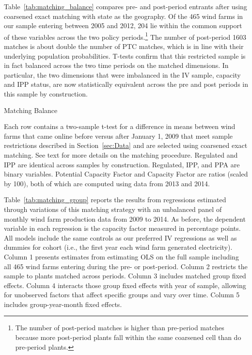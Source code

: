 \documentclass[12pt]{article}
\begin{document}
Table~\ref{tab:matching_balance} compares pre- and post-period entrants after using coarsened exact matching with state as the geography. Of the 465 wind farms in our sample entering between 2005 and 2012, 204 lie within the common support of these variables across the two policy periods.\footnote{The number of post-period matches is higher than pre-period matches because more post-period plants fall within the same coarsened cell than do pre-period plants.} The number of post-period 1603 matches is about double the number of PTC matches, which is in line with their underlying population probabilities. T-tests confirm that this restricted sample is in fact balanced across the two time periods on the matched dimensions. In particular, the two dimensions that were imbalanced in the IV sample, capacity and IPP status, are now statistically equivalent across the pre and post periods in this sample by construction. 

\begin{table}[h]
\caption{Matching Balance \label{tab:matching_balance}}

\footnotesize
Each row contains a two-sample t-test for a difference in means between wind farms that came online before versus after January 1, 2009 that meet sample restrictions described in Section~\ref{sec:Data} and are selected using coarsened exact matching. See text for more details on the matching procedure. Regulated and IPP are identical across samples by construction. Regulated, IPP, and PPA are binary variables. Potential Capacity Factor and Capacity Factor are ratios (scaled by 100), both of which are computed using data from 2013 and 2014.
\end{table}

Table~\ref{tab:matching_group} reports the results from regressions estimated through variations of this matching strategy with an unbalanced panel of monthly wind farm production data from 2009 to 2014. As before, the dependent variable in each regression is the capacity factor measured in percentage points. All models include the same controls as our preferred IV regressions as well as dummies for cohort (i.e., the first year each wind farm generated electricity). Column 1 presents estimates from estimating OLS on the full sample including all 465 wind farms entering during the pre- or post-period. Column 2 restricts the sample to plants matched across periods. Column 3 includes matched group fixed effects. Column 4 interacts those group fixed effects with year of sample, allowing for unobserved factors that affect specific groups and vary over time. Column 5 includes group-year-month fixed effects. 
\end{document}
